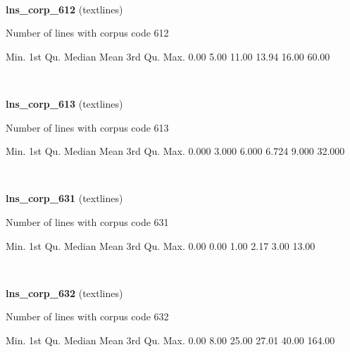 \documentclass[]{article}
\newenvironment{Shaded}{\begin{snugshade}}{\end{snugshade}}
\newcommand{\FloatTok}[1]{\textcolor[rgb]{0.00,0.00,0.81}{{#1}}}
\newcommand{\NormalTok}[1]{{#1}}
\begin{document}
~

\vspace{1em}

\textbf{lns\_corp\_612} (textlines)

Number of lines with corpus code 612

\begin{Shaded}
\begin{Highlighting}[]
   \NormalTok{Min. 1st Qu.  Median    Mean 3rd Qu.    Max. }
   \FloatTok{0.00}    \FloatTok{5.00}   \FloatTok{11.00}   \FloatTok{13.94}   \FloatTok{16.00}   \FloatTok{60.00} 
\end{Highlighting}
\end{Shaded}

~

\vspace{1em}

\textbf{lns\_corp\_613} (textlines)

Number of lines with corpus code 613

\begin{Shaded}
\begin{Highlighting}[]
   \NormalTok{Min. 1st Qu.  Median    Mean 3rd Qu.    Max. }
  \FloatTok{0.000}   \FloatTok{3.000}   \FloatTok{6.000}   \FloatTok{6.724}   \FloatTok{9.000}  \FloatTok{32.000} 
\end{Highlighting}
\end{Shaded}

~

\vspace{1em}

\textbf{lns\_corp\_631} (textlines)

Number of lines with corpus code 631

\begin{Shaded}
\begin{Highlighting}[]
   \NormalTok{Min. 1st Qu.  Median    Mean 3rd Qu.    Max. }
   \FloatTok{0.00}    \FloatTok{0.00}    \FloatTok{1.00}    \FloatTok{2.17}    \FloatTok{3.00}   \FloatTok{13.00} 
\end{Highlighting}
\end{Shaded}

~

\vspace{1em}

\textbf{lns\_corp\_632} (textlines)

Number of lines with corpus code 632

\begin{Shaded}
\begin{Highlighting}[]
   \NormalTok{Min. 1st Qu.  Median    Mean 3rd Qu.    Max. }
   \FloatTok{0.00}    \FloatTok{8.00}   \FloatTok{25.00}   \FloatTok{27.01}   \FloatTok{40.00}  \FloatTok{164.00} 
\end{Highlighting}
\end{Shaded}
\end{document}
